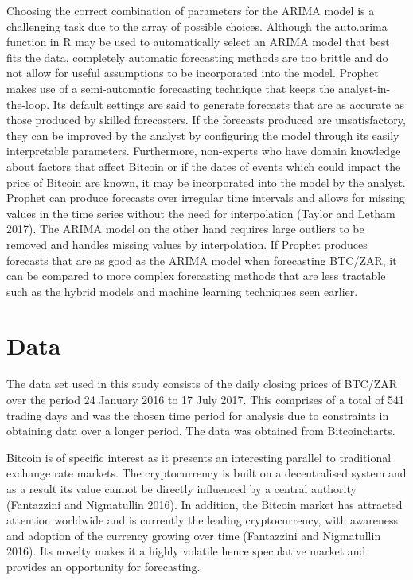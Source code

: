 \documentclass[12pt,a4paper]{article}
\numberwithin{equation}{section}
\numberwithin{figure}{section}
\numberwithin{table}{section}
\begin{document}
Choosing the correct combination of parameters for the ARIMA model is a
challenging task due to the array of possible choices. Although the
auto.arima function in R may be used to automatically select an ARIMA
model that best fits the data, completely automatic forecasting methods
are too brittle and do not allow for useful assumptions to be
incorporated into the model. Prophet makes use of a semi-automatic
forecasting technique that keeps the analyst-in-the-loop. Its default
settings are said to generate forecasts that are as accurate as those
produced by skilled forecasters. If the forecasts produced are
unsatisfactory, they can be improved by the analyst by configuring the
model through its easily interpretable parameters. Furthermore,
non-experts who have domain knowledge about factors that affect Bitcoin
or if the dates of events which could impact the price of Bitcoin are
known, it may be incorporated into the model by the analyst. Prophet can
produce forecasts over irregular time intervals and allows for missing
values in the time series without the need for interpolation (Taylor and
Letham 2017). The ARIMA model on the other hand requires large outliers
to be removed and handles missing values by interpolation. If Prophet
produces forecasts that are as good as the ARIMA model when forecasting
BTC/ZAR, it can be compared to more complex forecasting methods that are
less tractable such as the hybrid models and machine learning techniques
seen earlier.

\section{\texorpdfstring{Data \label{Data}}{Data }}\label{data}

The data set used in this study consists of the daily closing prices of
BTC/ZAR over the period 24 January 2016 to 17 July 2017. This comprises
of a total of 541 trading days and was the chosen time period for
analysis due to constraints in obtaining data over a longer period. The
data was obtained from Bitcoincharts.

Bitcoin is of specific interest as it presents an interesting parallel
to traditional exchange rate markets. The cryptocurrency is built on a
decentralised system and as a result its value cannot be directly
influenced by a central authority (Fantazzini and Nigmatullin 2016). In
addition, the Bitcoin market has attracted attention worldwide and is
currently the leading cryptocurrency, with awareness and adoption of the
currency growing over time (Fantazzini and Nigmatullin 2016). Its
novelty makes it a highly volatile hence speculative market and provides
an opportunity for forecasting.
\end{document}
